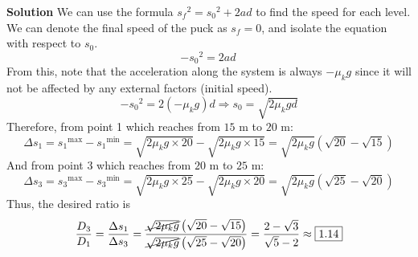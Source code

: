 \documentclass[12pt]{article}
\begin{document}
	\begin{mybox}{\textbf{Solution}}
		We can use the formula $ {s_f}^2 = {s_0}^2 + 2ad $ to find the speed for each level. We can denote the final speed of the puck as $s_f = 0$, and isolate the equation with respect to $s_0$. 
		\[ - {s_0}^2 = 2ad \,  \] 
		From this, note that the acceleration along the system is always $- \mu_k g$ since it will not be affected by any external factors (initial speed).
		\[ - {s_0}^2 = 2( - \mu_k g )d  \Rightarrow  s_0 = \sqrt{2 \mu_k g d }\]
		Therefore, from point 1 which reaches from $15\text{ m}$ to $20\text{ m}$: 
		\[ \Delta s_1 = {s_1}^{\text{max}} - {s_1}^{\text{min}}  = \sqrt{2 \mu_k g \times 20 } - \sqrt{2 \mu_k g \times 15} = \sqrt{2 \mu_k g}\left( \sqrt{20} - \sqrt{15} \right) \]
		And from point 3 which reaches from $20\text{ m}$ to $25\text{ m}$: 
		\[ \Delta s_3 = {s_3}^{\text{max}} - {s_3}^{\text{min}}  = \sqrt{2 \mu_k g \times 25 } - \sqrt{2 \mu_k g \times 20} = \sqrt{2 \mu_k g}\left( \sqrt{25} - \sqrt{20} \right) \]
		Thus, the desired ratio is 
		\[ \frac{D_3}{D_1} = \frac{\Delta s_1}{\Delta s_3} = \frac{ \cancel{\sqrt{2 \mu_k g}}\left( \sqrt{20} - \sqrt{15} \right)  }{ \cancel{\sqrt{2 \mu_k g}}\left( \sqrt{25} - \sqrt{20} \right)  } = \frac{2-\sqrt{3}}{\sqrt{5} - 2} \approx \boxed{1.14}  \]
	\end{mybox}
\end{document}
